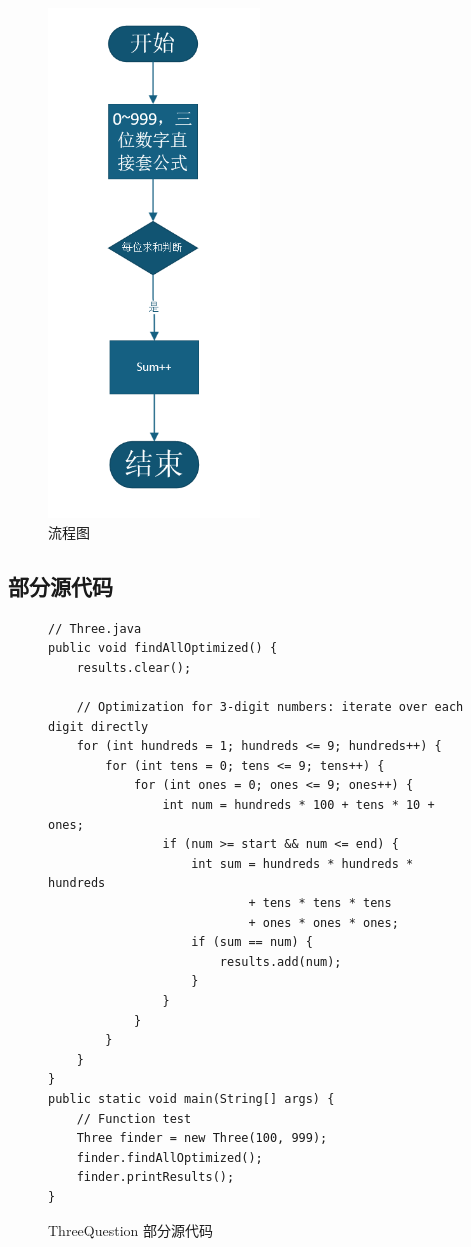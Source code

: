 \documentclass[12pt,a4paper]{article}
\begin{document}
\begin{figure}[H]
\centering
\includegraphics[width=0.5\textwidth]{three1.png}
\caption{流程图}
\end{figure}

\subsection*{部分源代码}
\begin{figure}[H]
\centering
\begin{lstlisting}
// Three.java
public void findAllOptimized() {
    results.clear();

    // Optimization for 3-digit numbers: iterate over each digit directly
    for (int hundreds = 1; hundreds <= 9; hundreds++) {
        for (int tens = 0; tens <= 9; tens++) {
            for (int ones = 0; ones <= 9; ones++) {
                int num = hundreds * 100 + tens * 10 + ones;
                if (num >= start && num <= end) {
                    int sum = hundreds * hundreds * hundreds
                            + tens * tens * tens
                            + ones * ones * ones;
                    if (sum == num) {
                        results.add(num);
                    }
                }
            }
        }
    }
}
public static void main(String[] args) {
    // Function test
    Three finder = new Three(100, 999);
    finder.findAllOptimized();
    finder.printResults();
}

\end{lstlisting}
\caption{ThreeQuestion 部分源代码}
\end{figure}
\end{document}

